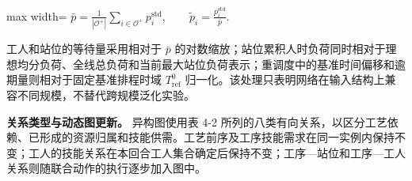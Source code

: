 \documentclass[journal,10pt]{IEEEtran}
\begin{document}
\begin{center}
\begin{adjustbox}{max width=\columnwidth}
$\displaystyle
\bar p=\frac{1}{|\mathcal{O}^{+}|}\sum_{i\in\mathcal{O}^{+}}p_i^{\mathrm{std}},
\qquad
\widetilde p_i=\frac{p_i^{\mathrm{std}}}{\bar p}.
$
\end{adjustbox}
\end{center}

工人和站位的等待量采用相对于 \(\bar p\) 的对数缩放；站位累积人时负荷同时相对于理想均分负荷、全线总负荷和当前最大站位负荷表示；重调度中的基准时间偏移和逾期量则相对于固定基准排程时域 \(T_{\mathrm{ref}}^0\) 归一化。该处理只表明网络在输入结构上兼容不同规模，不替代跨规模泛化实验。

\textbf{关系类型与动态图更新。} 异构图使用表 4-2 所列的八类有向关系，以区分工艺依赖、已形成的资源归属和技能供需。工艺前序及工序技能需求在同一实例内保持不变；工人的技能关系在本回合工人集合确定后保持不变；工序---站位和工序---工人关系则随联合动作的执行逐步加入图中。
\end{document}
